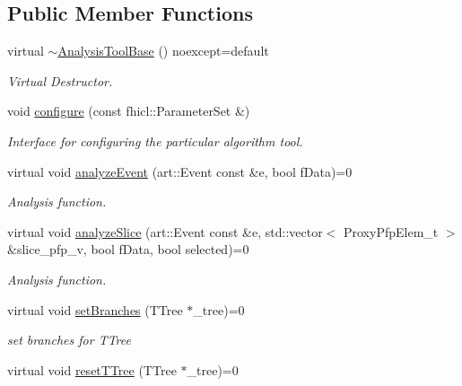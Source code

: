 \subsection*{Public Member Functions}
\begin{DoxyCompactItemize}
\item 
\hypertarget{classanalysis_1_1AnalysisToolBase_a24a388ad7ccb4007307b2e429acc8967}{virtual \hyperlink{classanalysis_1_1AnalysisToolBase_a24a388ad7ccb4007307b2e429acc8967}{$\sim$\-Analysis\-Tool\-Base} () noexcept=default}\label{classanalysis_1_1AnalysisToolBase_a24a388ad7ccb4007307b2e429acc8967}

\begin{DoxyCompactList}\small\item\em Virtual Destructor. \end{DoxyCompactList}\item 
void \hyperlink{classanalysis_1_1AnalysisToolBase_a99bb8301fb7988663c6febc152e4060f}{configure} (const fhicl\-::\-Parameter\-Set \&)
\begin{DoxyCompactList}\small\item\em Interface for configuring the particular algorithm tool. \end{DoxyCompactList}\item 
virtual void \hyperlink{classanalysis_1_1AnalysisToolBase_ad5079f85c78e6c40f70ebf4ee31f5600}{analyze\-Event} (art\-::\-Event const \&e, bool f\-Data)=0
\begin{DoxyCompactList}\small\item\em Analysis function. \end{DoxyCompactList}\item 
virtual void \hyperlink{classanalysis_1_1AnalysisToolBase_ac1611ea1b1a5db62a6543709ec1d2e96}{analyze\-Slice} (art\-::\-Event const \&e, std\-::vector$<$ Proxy\-Pfp\-Elem\-\_\-t $>$ \&slice\-\_\-pfp\-\_\-v, bool f\-Data, bool selected)=0
\begin{DoxyCompactList}\small\item\em Analysis function. \end{DoxyCompactList}\item 
\hypertarget{classanalysis_1_1AnalysisToolBase_a03a79460c4d2466d0b9fa102517a4a2d}{virtual void \hyperlink{classanalysis_1_1AnalysisToolBase_a03a79460c4d2466d0b9fa102517a4a2d}{set\-Branches} (T\-Tree $\ast$\-\_\-tree)=0}\label{classanalysis_1_1AnalysisToolBase_a03a79460c4d2466d0b9fa102517a4a2d}

\begin{DoxyCompactList}\small\item\em set branches for T\-Tree \end{DoxyCompactList}\item 
\hypertarget{classanalysis_1_1AnalysisToolBase_a005e4aa5853d1f2ebc4592b73ae3f9cc}{virtual void \hyperlink{classanalysis_1_1AnalysisToolBase_a005e4aa5853d1f2ebc4592b73ae3f9cc}{reset\-T\-Tree} (T\-Tree $\ast$\-\_\-tree)=0}\label{classanalysis_1_1AnalysisToolBase_a005e4aa5853d1f2ebc4592b73ae3f9cc}


\end{DoxyCompactItemize}
